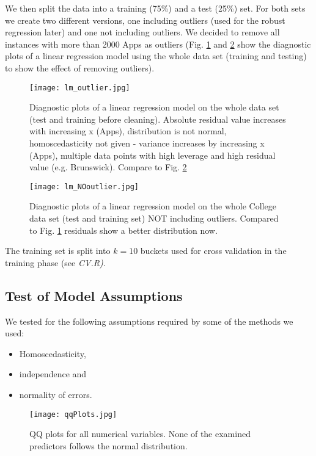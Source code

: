 \documentclass[a4paper]{article}
\begin{document}
We then split the data into a training (75\%) and a test (25\%) set. For both sets we create two different versions, one including outliers (used for the robust regression later) and one not including outliers. We decided to remove all instances with more than 2000 Apps as outliers (Fig. \ref{fig:lmAll} and \ref{fig:lmAllNoOulier} show the diagnostic plots of a linear regression model using the whole data set (training and testing) to show the effect of removing outliers).

\begin{figure}[H]
	\centering
	\texttt{[image: lm\_outlier.jpg]}
	\caption{\label{fig:lmAll}Diagnostic plots of a linear regression model on the whole data set (test and training before cleaning). Absolute residual value increases with increasing x (Apps), distribution is not normal, homoscedasticity not given - variance increases by increasing x (Apps), multiple data points with high leverage and high residual value (e.g. Brunswick). Compare to Fig.  \ref{fig:lmAllNoOulier}}
\end{figure}

\begin{figure}[H]
	\centering
	\texttt{[image: lm\_NOoutlier.jpg]}
	\caption{\label{fig:lmAllNoOulier}Diagnostic plots of a linear regression model on the whole College data set (test and training set) NOT including outliers. Compared to Fig. \ref{fig:lmAll} residuals show a better distribution now.}
\end{figure}

The training set is split into $k = 10$ buckets used for cross validation in the training phase (see \it{CV.R}\rm).

\subsection{Test of Model Assumptions}
We tested for the following assumptions required by some of the methods we used: 
\begin{itemize}
  \item Homoscedasticity,
  \item independence and
  \item normality of errors.
\end{itemize}

\begin{figure}[H]
	\centering
	\texttt{[image: qqPlots.jpg]}
	\caption{\label{fig:qqPlots_regression}QQ plots for all numerical variables. None of the examined predictors follows the normal distribution.}
\end{figure}
\end{document}
